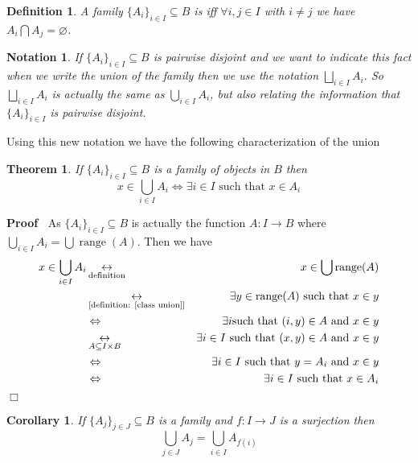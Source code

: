 \documentclass{book}
\newcommand{\Leftrightarrowlim}{\mathop{\leftrightarrow}\limits}
\newcommand{\infixand}{\text{ and }}
\newcommand{\tmop}[1]{\ensuremath{\operatorname{#1}}}
\newcommand{\tmtextbf}[1]{\text{{\bfseries{#1}}}}
\newenvironment{proof}{\noindent\textbf{Proof\ }}{\hspace*{\fill}$\Box$\medskip}
\newtheorem{corollary}{Corollary}
\newtheorem{definition}{Definition}
{\theorembodyfont{\rmfamily}\newtheorem{example}{Example}}
\newtheorem{notation}{Notation}
{\theorembodyfont{\rmfamily}\newtheorem{note}{Note}}
\newtheorem{theorem}{Theorem}
\begin{document}
\begin{definition}
  A family $\{ A_i \}_{i \in I} \subseteq B$ is \tmtextbf{pairwise disjoint}
  iff $\forall i, j \in I$ with $i \neq j$ we have $A_i \bigcap A_j =
  \varnothing$.
\end{definition}

\begin{notation}
  If $\{ A_i \}_{i \in I} \subseteq B$ is pairwise disjoint and we want to
  indicate this fact when we write the union of the family then we use the
  notation $\bigsqcup_{i \in I} A_i$. So $\bigsqcup_{i \in I} A_i$ is actually
  the same as $\bigcup_{i \in I} A_i$, but also relating the information that
  $\{ A_i \}_{i \in I}$ is pairwise disjoint.
\end{notation}

Using this new notation we have the following characterization of the union

\begin{theorem}
  \label{family union (2)}If $\{ A_i \}_{i \in I} \subseteq B$ is a family of
  objects in $B$ then
  \[ x \in \bigcup_{i \in I} A_i \Leftrightarrow \exists i \in I \text{ such
     that } x \in A_i \]
\end{theorem}

\begin{proof}
  As $\{ A_i \}_{i \in I} \subseteq B$ is actually the function $A : I
  \rightarrow B$ where $\bigcup_{i \in I} A_i = \bigcup \tmop{range} (A)$.
  Then we have
  \begin{eqnarray*}
    x \in \bigcup_{i \in I} A_i & \Leftrightarrowlim_{\text{definition}} & x
    \in \bigcup \tmop{range} (A)\\
    & \Leftrightarrowlim_{\text{[definition: \ref{class union}]}} & \exists y
    \in \tmop{range} (A) \text{ such that } x \in y\\
    & \Leftrightarrow & \exists i \text{such that } (i, y) \in A \text{ and }
    x \in y\\
    & \Leftrightarrowlim_{A \subseteq I \times B} & \exists i \in I \text{
    such that } (x, y) \in A \infixand x \in y\\
    & \Leftrightarrow & \exists i \in I \text{ such that $y = A_i \text{ and
    $x \in y$}$}\\
    & \Leftrightarrow & \exists i \in I \text{ such that $x \in A_i$}
  \end{eqnarray*}
\end{proof}

\begin{corollary}
  \label{family union of family set and surjections}If $\{ A_j \}_{j \in J}
  \subseteq B$ is a family and $f : I \rightarrow J$ is a surjection then
  \[ \bigcup_{j \in J} A_j = \bigcup_{i \in I} A_{f (i)} \]
\end{corollary}
\end{document}
